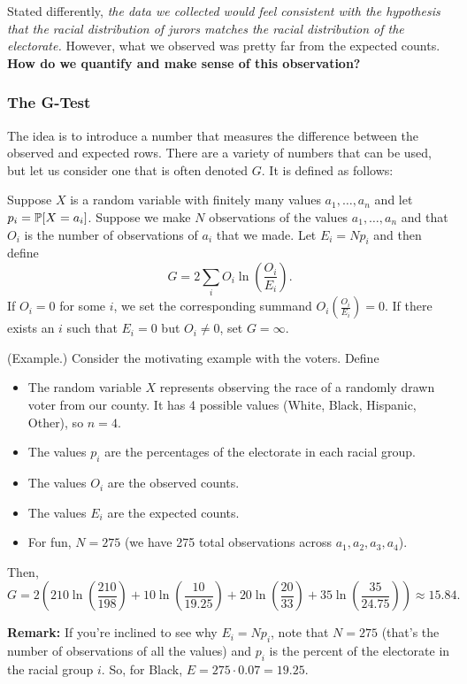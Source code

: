 \documentclass[letterpaper]{article}
\newcommand{\0}{\mathbf{0}}
\begin{document}
\bigskip 

Stated differently, \emph{the data we collected would feel consistent with the hypothesis that the racial distribution of jurors matches the racial distribution of the electorate.} However, what we observed was pretty far from the expected counts. \textbf{How do we quantify and make sense of this observation?}

\subsubsection{The G-Test}
The idea is to introduce a number that measures the difference between the observed and expected rows. There are a variety of numbers that can be used, but let us consider one that is often denoted $G$. It is defined as follows: 

\begin{definition}{}{}
    Suppose $X$ is a random variable with finitely many values $a_1, \hdots, a_n$ and let $p_i = \mathbb{P}[X = a_i]$. Suppose we make $N$ observations of the values $a_1, \hdots, a_n$ and that $O_i$ is the number of observations of $a_i$ that we made. Let $E_i = Np_i$ and then define \[G = 2\sum_{i} O_i \ln\left(\frac{O_i}{E_i}\right).\] If $O_i = 0$ for some $i$, we set the corresponding summand $O_i\left(\frac{O_i}{E_i}\right) = 0$. If there exists an $i$ such that $E_i = 0$ but $O_i \neq 0$, set $G = \infty$. 
\end{definition}

\begin{mdframed}
    (Example.) Consider the motivating example with the voters. Define 
    \begin{itemize}
        \item The random variable $X$ represents observing the race of a randomly drawn voter from our county. It has 4 possible values (White, Black, Hispanic, Other), so $n = 4$. 
        
        \item The values $p_i$ are the percentages of the electorate in each racial group. 
        \item The values $O_i$ are the observed counts. 
        
        \item The values $E_i$ are the expected counts. 
        
        \item For fun, $N = 275$ (we have 275 total observations across $a_1, a_2, a_3, a_4$). 
    \end{itemize}
    Then, 
    \[G = 2\left(210 \ln\left(\frac{210}{198}\right) + 10 \ln\left(\frac{10}{19.25}\right) + 20 \ln\left(\frac{20}{33}\right) + 35\ln\left(\frac{35}{24.75}\right)\right) \approx 15.84.\]
\end{mdframed}
\textbf{Remark:} If you're inclined to see why $E_i = Np_i$, note that $N = 275$ (that's the number of observations of all the values) and $p_i$ is the percent of the electorate in the racial group $i$. So, for Black, $E = 275 \cdot 0.07 = 19.25$. 
\end{document}
